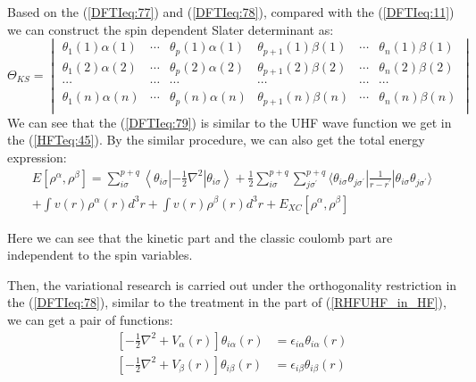 Based on the (\ref{DFTIeq:77}) and (\ref{DFTIeq:78}), compared with
the (\ref{DFTIeq:11}) we can construct the spin dependent Slater
determinant as:
\begin{equation}
\label{DFTIeq:79} \Theta_{KS} =
 \begin{vmatrix}
         \theta_{1}(1)\alpha(1)  & \cdots  & \theta_{p}(1)\alpha(1)
       & \theta_{p+1}(1)\beta(1) & \cdots  & \theta_{n}(1)\beta(1)  \\
         \theta_{1}(2)\alpha(2)  & \cdots  & \theta_{p}(2)\alpha(2)
       & \theta_{p+1}(2)\beta(2) & \cdots  & \theta_{n}(2)\beta(2)  \\
          \cdots                 & \cdots  & \cdots
       &  \cdots                 & \cdots  & \cdots                  \\
         \theta_{1}(n)\alpha(n)  & \cdots  & \theta_{p}(n)\alpha(n)
       & \theta_{p+1}(n)\beta(n) & \cdots  & \theta_{n}(n)\beta(n)  \\
       \end{vmatrix}
\end{equation}
We can see that the (\ref{DFTIeq:79}) is similar to the UHF wave
function we get in the (\ref{HFTeq:45}). By the similar procedure,
we can also get the total energy expression:
\begin{multline}
  \label{DFTIeq:80}
  E[\rho^{\alpha}, \rho^{\beta}] =
\sum^{p+q}_{i\sigma} \left\langle\theta_{i\sigma}
\left|-\frac{1}{2}\nabla^{2}\right| \theta_{i\sigma}\right\rangle +
\frac{1}{2}\sum^{p+q}_{i\sigma}\sum^{p+q}_{j\sigma^{'}} \langle
\theta_{i\sigma}\theta_{j\sigma^{'}}|\frac{1}{r -
  r^{'}}|
\theta_{i\sigma}\theta_{j\sigma^{'}} \rangle \\
+ \int v(r)\rho^{\alpha}(r)d^{3}r + \int v(r)\rho^{\beta}(r)d^{3}r +
E_{XC}[\rho^{\alpha}, \rho^{\beta}]
\end{multline}

Here we can see that the kinetic part and the classic coulomb part
are independent to the spin variables.

Then, the variational research is carried out under the
orthogonality restriction in the (\ref{DFTIeq:78}), similar to the
treatment in the part of (\ref{RHFUHF_in_HF}), we can get a pair of
functions:
\begin{align}
\label{DFTIeq:81} \left[-\frac{1}{2}\nabla^{2} +
  V_{\alpha}(r)\right]\theta_{i\alpha}(r) &=
\epsilon_{i\alpha}\theta_{i\alpha}(r) \nonumber \\
\left[-\frac{1}{2}\nabla^{2} +
  V_{\beta}(r)\right]\theta_{i\beta}(r) &=
\epsilon_{i\beta}\theta_{i\beta}(r)
\end{align}

